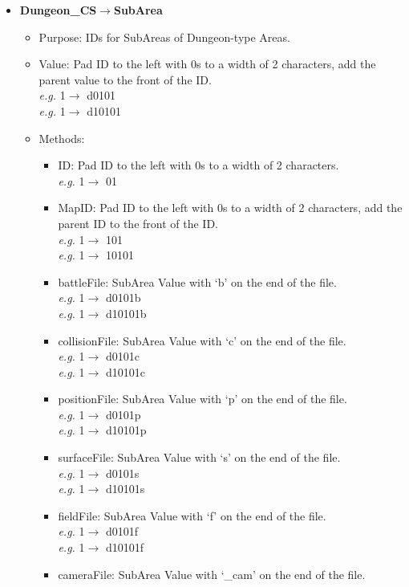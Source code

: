 \documentclass{article}
\begin{document}
\begin{itemize}
	\item \textbf{Dungeon\_CS}$\rightarrow$\textbf{SubArea}
	\begin{itemize}
		\item Purpose: IDs for SubAreas of Dungeon-type Areas.
		\item Value: Pad ID to the left with 0s to a width of 2 characters, add the parent value to the front of the ID.\\
		\textit{e.g.} 1$\rightarrow$ d0101\\
		\textit{e.g.} 1$\rightarrow$ d10101
		\item Methods:
		\begin{itemize}
			\item ID:  Pad ID to the left with 0s to a width of 2 characters.\\
			\textit{e.g.} 1$\rightarrow$ 01
			\item MapID:  Pad ID to the left with 0s to a width of 2 characters, add the parent ID to the front of the ID.\\
			\textit{e.g.} 1$\rightarrow$ 101\\
			\textit{e.g.} 1$\rightarrow$ 10101
			\item battleFile: SubArea Value with `b' on the end of the file.\\
			\textit{e.g.} 1$\rightarrow$ d0101b\\
			\textit{e.g.} 1$\rightarrow$ d10101b
			\item collisionFile: SubArea Value with `c' on the end of the file.\\
			\textit{e.g.} 1$\rightarrow$ d0101c\\
			\textit{e.g.} 1$\rightarrow$ d10101c
			\item positionFile: SubArea Value with `p' on the end of the file.\\
			\textit{e.g.} 1$\rightarrow$ d0101p\\
			\textit{e.g.} 1$\rightarrow$ d10101p
			\item surfaceFile: SubArea Value with `s' on the end of the file.\\
			\textit{e.g.} 1$\rightarrow$ d0101s\\
			\textit{e.g.} 1$\rightarrow$ d10101s
			\item fieldFile: SubArea Value with `f' on the end of the file.\\
			\textit{e.g.} 1$\rightarrow$ d0101f\\
			\textit{e.g.} 1$\rightarrow$ d10101f
			\item cameraFile: SubArea Value with `\_cam' on the end of the file.\\

\end{itemize}
\end{itemize}
\end{itemize}
\end{document}
